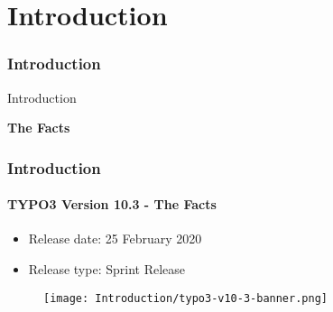 %

\section{Introduction}
\begin{frame}[fragile]
	\frametitle{Introduction}

	\begin{center}\huge{Introduction}\end{center}
	\begin{center}\huge{\color{typo3darkgrey}\textbf{The Facts}}\end{center}

\end{frame}


\begin{frame}[fragile]
	\frametitle{Introduction}
	\framesubtitle{TYPO3 Version 10.3 - The Facts}

	\begin{itemize}
		\item Release date: 25 February 2020
		\item Release type: Sprint Release
	\end{itemize}

	\begin{figure}
		\texttt{[image: Introduction/typo3-v10-3-banner.png]}
	\end{figure}

\end{frame}


